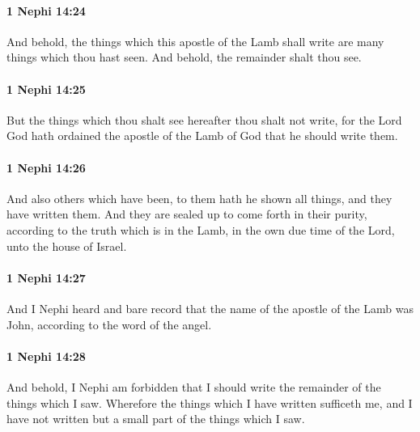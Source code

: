 		\paragraph{1 Nephi 14:24} %
			\label{1NEPHI-14-24}

			And behold, the things which this apostle of the Lamb shall write
			are many things which thou hast seen.
			And behold, the remainder shalt thou see.

		\paragraph{1 Nephi 14:25} %
			\label{1NEPHI-14-25}

			But the things which thou shalt see hereafter
			thou shalt not write,
			for the Lord God hath ordained the apostle of the Lamb of God
			that he should write them.

		\paragraph{1 Nephi 14:26} %
			\label{1NEPHI-14-26}

			And also others which have been,
			to them hath he shown all things,
			and they have written them.
			And they are sealed up to come forth in their purity,
			according to the truth which is in the Lamb,
			in the own due time of the Lord,
			unto the house of Israel.

		\paragraph{1 Nephi 14:27} %
			\label{1NEPHI-14-27}

			And I Nephi heard and bare record
			that the name of the apostle of the Lamb was John,
			according to the word of the angel.

		\paragraph{1 Nephi 14:28} %
			\label{1NEPHI-14-28}

			And behold, I Nephi am forbidden
			that I should write the remainder of the things which I saw.
			Wherefore the things which I have written sufficeth me,
			and I have not written but a small part of the things which I saw.

